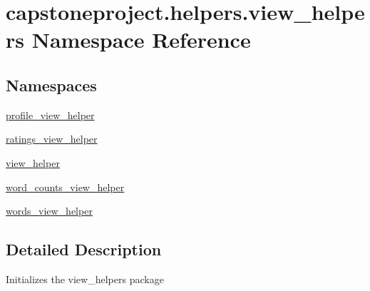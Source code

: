 \hypertarget{namespacecapstoneproject_1_1helpers_1_1view__helpers}{}\section{capstoneproject.\+helpers.\+view\+\_\+helpers Namespace Reference}
\label{namespacecapstoneproject_1_1helpers_1_1view__helpers}
\subsection*{Namespaces}
\begin{DoxyCompactItemize}
\item 
 \mbox{\hyperlink{namespacecapstoneproject_1_1helpers_1_1view__helpers_1_1profile__view__helper}{profile\+\_\+view\+\_\+helper}}
\item 
 \mbox{\hyperlink{namespacecapstoneproject_1_1helpers_1_1view__helpers_1_1ratings__view__helper}{ratings\+\_\+view\+\_\+helper}}
\item 
 \mbox{\hyperlink{namespacecapstoneproject_1_1helpers_1_1view__helpers_1_1view__helper}{view\+\_\+helper}}
\item 
 \mbox{\hyperlink{namespacecapstoneproject_1_1helpers_1_1view__helpers_1_1word__counts__view__helper}{word\+\_\+counts\+\_\+view\+\_\+helper}}
\item 
 \mbox{\hyperlink{namespacecapstoneproject_1_1helpers_1_1view__helpers_1_1words__view__helper}{words\+\_\+view\+\_\+helper}}
\end{DoxyCompactItemize}


\subsection{Detailed Description}
\begin{DoxyVerb}Initializes the view_helpers package
\end{DoxyVerb}
 